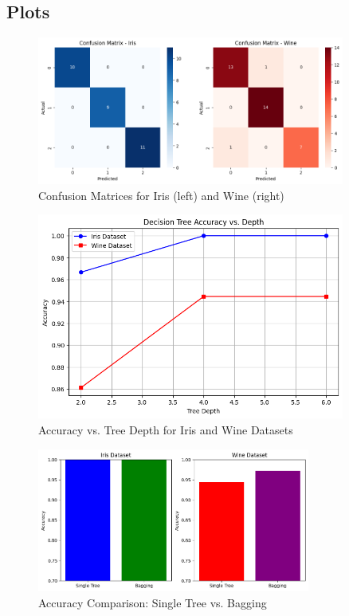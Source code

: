 \documentclass[a4paper,12pt]{article}
\begin{document}
\subsection{Plots}

\begin{figure}[H]
    \centering
    \includegraphics[width=0.9\textwidth]{Q4.png}
    \caption{Confusion Matrices for Iris (left) and Wine (right)}
\end{figure}

\begin{figure}[H]
    \centering
    \includegraphics[width=0.9\textwidth]{Q4_4.png}
    \caption{Accuracy vs. Tree Depth for Iris and Wine Datasets}
\end{figure}

\begin{figure}[H]
    \centering
    \includegraphics[width=0.8\textwidth]{Q4_5.png}
    \caption{Accuracy Comparison: Single Tree vs. Bagging}
\end{figure}
\end{document}
